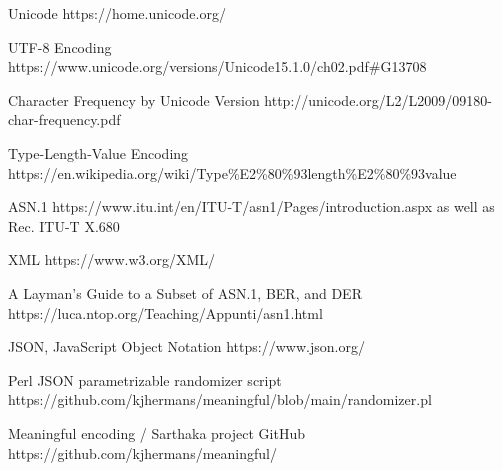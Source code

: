 \newpage
\begin{thebibliography}{12}

\setlength{\leftskip}{-5cm}

  Unicode
  https://home.unicode.org/

  UTF-8 Encoding
  https://www.unicode.org/versions/Unicode15.1.0/ch02.pdf\#G13708

  Character Frequency by Unicode Version
  http://unicode.org/L2/L2009/09180-char-frequency.pdf

  Type-Length-Value Encoding
  https://en.wikipedia.org/wiki/Type\%E2\%80\%93length\%E2\%80\%93value

  ASN.1
  https://www.itu.int/en/ITU-T/asn1/Pages/introduction.aspx
  as well as Rec. ITU-T X.680

  XML
  https://www.w3.org/XML/

  A Layman's Guide to a Subset of ASN.1, BER, and DER
  https://luca.ntop.org/Teaching/Appunti/asn1.html

  JSON, JavaScript Object Notation
  https://www.json.org/

  Perl JSON parametrizable randomizer script
  https://github.com/kjhermans/meaningful/blob/main/randomizer.pl

  Meaningful encoding / Sarthaka project GitHub
  https://github.com/kjhermans/meaningful/

\setlength{\leftskip}{0cm}

\end{thebibliography}
